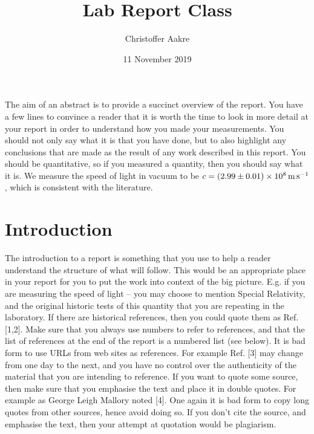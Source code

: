 \documentclass{labreport}
\author{Christoffer Aakre}
\title{Lab Report Class}
\date{11 November 2019}
\begin{document}
\maketitle

The aim of an abstract is to provide a succinct overview of the report.  You have a few lines 
to convince a reader that it is worth the time to look in more detail at your report in order 
to understand how you made your measurements.  You should not only say what it is that 
you have done, but to also highlight any conclusions that are made as the result of any 
work described in this report.  You should be quantitative, so if you measured a quantity,
then you should say what it is.  We measure the speed of light in vacuum to be
$c = (2.99 \pm 0.01) \times \SI{E8}{\meter\per\second}$, which is consistent with the literature.

\section*{Introduction}
The  introduction  to  a  report  is  something  that  you  use  to  help  a  reader  
understand  the  structure  of  what  will  follow.    This  would  be  an  appropriate  place  
in  your  report  for  you  to  put  the  work  into  context  of  the  big  picture.    E.g.  if  you  
are  measuring  the  speed  of  light  –  you  may  choose  to  mention  Special  Relativity,  
and  the  original  historic  tests  of  this  quantity  that  you  are  repeating  in  the  
laboratory.    If  there  are  historical  references,  then  you  could  quote  them  as  Ref.  
[1,2].      Make  sure  that  you  always  use  numbers  to  refer  to  references,  and  that  
the  list  of  references  at  the  end  of  the  report  is  a  numbered  list  (see  below).
It  is  bad  form  to  use  URLs  from  web  sites  as  references.    For  example  Ref.  [3]  
may  change  from  one  day  to  the  next,  and  you  have  no  control  over  the  
authenticity  of  the  material  that  you  are  intending  to  reference.    If  you  want  to
quote  some  source,  then  make  sure  that  you  emphasise  the  text  and  place  it  in  
double  quotes.    For  example  as  George  Leigh  Mallory  noted  \textit{}  [4].    One  again  it  is  bad  form  to  copy  long  
quotes  from  other  sources,  hence  avoid  doing  so.    If  you  don’t  cite  the  source,  and  
emphasise  the  text,  then  your  attempt  at  quotation  would  be  plagiarism.
\end{document}
